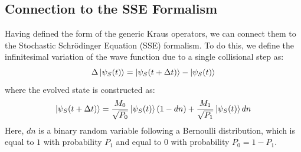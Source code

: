 \documentclass[a4paper,12pt]{article}
\begin{document}
\subsection{Connection to the SSE Formalism}
\label{sub:connection_to_SSE_Exc_Dimer}

Having defined the form of the generic Kraus operators, we can connect them to the Stochastic Schrödinger Equation (SSE) formalism. To do this, we define the infinitesimal variation of the wave function due to a single collisional step as:
\begin{equation}
	\Delta \ket{\psi_{S}(t)} = \ket{\psi_{S}(t + \Delta t)} - \ket{\psi_{S}(t)}
	\label{eq:diff_psi}
\end{equation}
where the evolved state is constructed as:
\begin{equation}
	\ket{\psi_{S}(t + \Delta t)} = \frac{M_{0}}{\sqrt{P_{0}}} \ket{\psi_{S}(t)} (1 - dn) + \frac{M_{1}}{\sqrt{P_{1}}} \ket{\psi_{S}(t)} dn
	\label{eq:generic_CM_to_SSE}
\end{equation} 
Here, $dn$ is a binary random variable following a Bernoulli distribution, which is equal to $1$ with probability $P_{1}$ and equal to $0$ with probability $P_{0} = 1 - P_{1}$.
\end{document}
